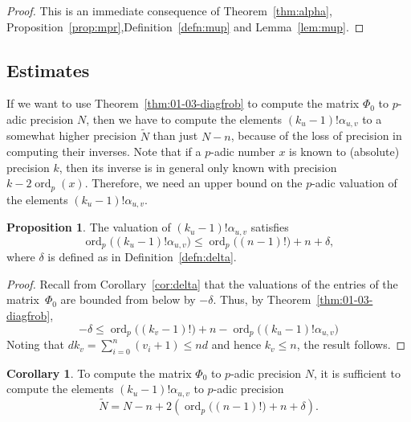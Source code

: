 \documentclass[a4paper,11pt]{article}
\numberwithin{equation}{section}
\DeclareMathOperator{\ord}{ord}          %
\theoremstyle{definition}
\newtheorem{prop}[thm]{Proposition}
\newtheorem{cor}[thm]{Corollary}
\begin{document}
\begin{proof}
This is an immediate consequence of Theorem~\ref{thm:alpha}, 
Proposition~\ref{prop:mpr},Definition~\ref{defn:mup} and Lemma~\ref{lem:mup}.
\end{proof}

\subsection{Estimates}

If we want to use Theorem~\ref{thm:01-03-diagfrob} to compute the matrix 
$\Phi_0$ to $p$-adic precision $N$, then we have to compute the elements
$(k_u-1)!\alpha_{u,v}$ to a somewhat higher precision $\tilde{N}$ than just
$N-n$, because 
of the loss of precision in computing their inverses. Note that if a $p$-adic 
number $x$ is known to (absolute) precision $k$, then its inverse is in general 
only known with precision $k-2\ord_p(x)$. Therefore, we need an upper bound
on the $p$-adic valuation of the elements $(k_u-1)!\alpha_{u,v}$.

\begin{prop}
The valuation of $(k_u-1)! \alpha_{u,v}$ satisfies
\begin{equation*}
\ord_p\bigl((k_u-1)! \alpha_{u,v}\bigr) 
    \leq \ord_p\bigl((n-1)!\bigr) + n + \delta,
\end{equation*}
where $\delta$ is defined as in Definition~\ref{defn:delta}. 
\end{prop}

\begin{proof}
Recall from Corollary~\ref{cor:delta} that the valuations 
of the entries of the matrix~$\Phi_0$ are bounded from below by $-\delta$. 
Thus, by Theorem~\ref{thm:01-03-diagfrob}, 
\begin{equation*}
-\delta \leq \ord_p\bigl((k_v-1)!\bigr) + n 
           - \ord_p\bigl((k_u-1)! \alpha_{u,v}\bigr)
\end{equation*}
Noting that $d k_v = \sum_{i=0}^n (v_i + 1) \leq n d$ and 
hence $k_v \leq n$, the result follows.
\end{proof}

\begin{cor} \label{cor:Ntilde}
To compute the matrix $\Phi_0$ to $p$-adic precision $N$, it is sufficient 
to compute the elements $(k_u-1)!\alpha_{u,v}$ to $p$-adic precision
\begin{equation*}
\tilde{N}=N-n+2(\ord_p\bigl((n-1)!\bigr)+n+\delta).
\end{equation*}
\end{cor}
\end{document}
